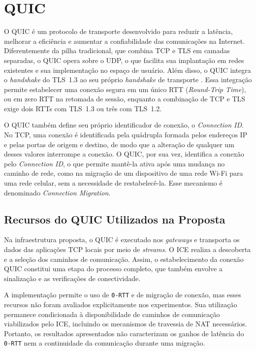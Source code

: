 \chapter{QUIC}
\label{chap:quic}

O QUIC \citep{rfc8999, rfc9000} é um protocolo de transporte desenvolvido para reduzir a latência, melhorar a eficiência e aumentar a confiabilidade das comunicações na Internet. Diferentemente da pilha tradicional, que combina TCP e TLS em camadas separadas, o QUIC opera sobre o UDP, o que facilita sua implantação em redes existentes e sua implementação no espaço de usuário. Além disso, o QUIC integra o \textit{handshake} do TLS~1.3 ao seu próprio \textit{handshake} de transporte \citep{rfc9001}. Essa integração permite estabelecer uma conexão segura em um único RTT (\textit{Round-Trip Time}), ou em zero RTT na retomada de sessão, enquanto a combinação de TCP e TLS exige dois RTTs com TLS~1.3 ou três com TLS~1.2.

O QUIC também define seu próprio identificador de conexão, o \textit{Connection ID}. No TCP, uma conexão é identificada pela quádrupla formada pelos endereços IP e pelas portas de origem e destino, de modo que a alteração de qualquer um desses valores interrompe a conexão. O QUIC, por sua vez, identifica a conexão pelo \textit{Connection ID}, o que permite mantê-la ativa após uma mudança no caminho de rede, como na migração de um dispositivo de uma rede Wi-Fi para uma rede celular, sem a necessidade de restabelecê-la. Esse mecanismo é denominado \textit{Connection Migration}.

\section{Recursos do QUIC Utilizados na Proposta}

Na infraestrutura proposta, o QUIC é executado nos \textit{gateways} e transporta os dados das aplicações TCP locais por meio de \textit{streams}. O ICE realiza a descoberta e a seleção dos caminhos de comunicação. Assim, o estabelecimento da conexão QUIC constitui uma etapa do processo completo, que também envolve a sinalização e as verificações de conectividade.

A implementação permite o uso de \texttt{0-RTT} e de migração de conexão, mas esses recursos não foram avaliados explicitamente nos experimentos. Sua utilização permanece condicionada à disponibilidade de caminhos de comunicação viabilizados pelo ICE, incluindo os mecanismos de travessia de NAT necessários. Portanto, os resultados apresentados não caracterizam os ganhos de latência do \texttt{0-RTT} nem a continuidade da comunicação durante uma migração.

